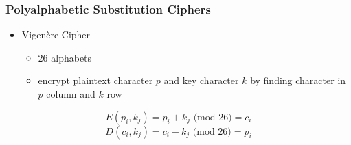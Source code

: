 \documentclass[12pt]{beamer}
\begin{document}
\begin{frame}
	\frametitle{Polyalphabetic Substitution Ciphers}
	\begin{itemize}
		\item Vigen\`{e}re Cipher
		\begin{itemize}
			\item 26 alphabets
			\item encrypt plaintext character $p$ and key character $k$ by finding character in $p$ column and $k$ row
		\end{itemize}
	\end{itemize}
	
	$$E(p_i, k_j)=p_i+k_j\text{ (mod 26)}=c_i$$
	$$D(c_i, k_j)=c_i-k_j\text{ (mod 26)}=p_i$$
	
\end{frame}
\end{document}
